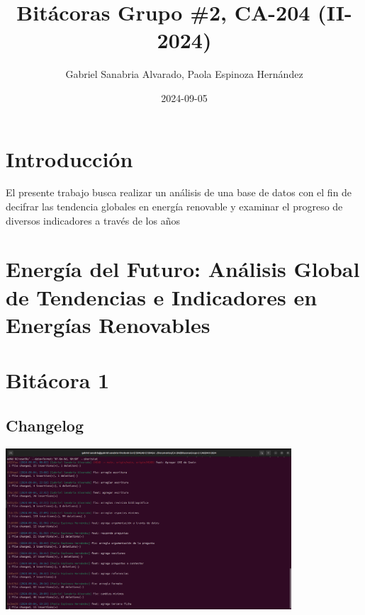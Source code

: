 \documentclass[
  letterpaper,
  DIV=11,
  numbers=noendperiod]{scrreprt}
\title{Bitácoras Grupo \#2, CA-204 (II-2024)}
\author{Gabriel Sanabria Alvarado, Paola Espinoza Hernández}
\date{2024-09-05}
\renewcommand*\contentsname{Tabla de contenidos}
\newcommand\contentsname{Tabla de contenidos}
\begin{document}
\maketitle

\renewcommand*\contentsname{Tabla de contenidos}
{
\hypersetup{linkcolor=}
\setcounter{tocdepth}{2}
\tableofcontents
}


\chapter*{Introducción}\label{introducciuxf3n}


El presente trabajo busca realizar un análisis de una base de datos con
el fin de decifrar las tendencia globales en energía renovable y
examinar el progreso de diversos indicadores a través de los años


\chapter{Energía del Futuro: Análisis Global de Tendencias e Indicadores
en Energías
Renovables}\label{energuxeda-del-futuro-anuxe1lisis-global-de-tendencias-e-indicadores-en-energuxedas-renovables}


\chapter{Bitácora 1}\label{bituxe1cora-1}

\section{Changelog}\label{changelog}

\begin{center}
\includegraphics[width=0.8\textwidth,height=\textheight]{capturagitlog.png}
\end{center}
\end{document}
